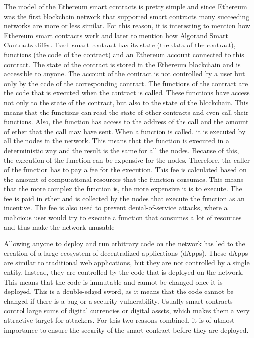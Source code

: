 The model of the Ethereum smart contracts is pretty simple and since Ethereum was the first blockchain network that supported smart contracts many succeeding networks are more or less similar. For this reason, it is interesting to mention how Ethereum smart contracts work and later to mention how Algorand Smart Contracts differ. Each smart contract has its state (the data of the contract), functions (the code of the contract) and an Ethereum account connected to this contract. The state of the contract is stored in the Ethereum blockchain and is accessible to anyone. The account of the contract is not controlled by a user but only by the code of the corresponding contract. The functions of the contract are the code that is executed when the contract is called. These functions have access not only to the state of the contract, but also to the state of the blockchain. This means that the functions can read the state of other contracts and even call their functions. Also, the function has access to the address of the call and the amount of ether that the call may have sent. When a function is called, it is executed by all the nodes in the network. This means that the function is executed in a deterministic way and the result is the same for all the nodes. Because of this, the execution of the function can be expensive for the nodes. Therefore, the caller of the function has to pay a fee for the execution. This fee is calculated based on the amount of computational resources that the function consumes. This means that the more complex the function is, the more expensive it is to execute. The fee is paid in ether and is collected by the nodes that execute the function as an incentive. The fee is also used to prevent denial-of-service attacks, where a malicious user would try to execute a function that consumes a lot of resources and thus make the network unusable.

Allowing anyone to deploy and run arbitrary code on the network has led to the creation of a large ecosystem of decentralized applications (dApps). These dApps are similar to traditional web applications, but they are not controlled by a single entity. Instead, they are controlled by the code that is deployed on the network. This means that the code is immutable and cannot be changed once it is deployed. This is a double-edged sword, as it means that the code cannot be changed if there is a bug or a security vulnerability. Usually smart contracts control large sums of digital currencies or digital assets, which makes them a very attractive target for attackers. For this two reasons combined, it is of utmost importance to ensure the security of the smart contract before they are deployed.


